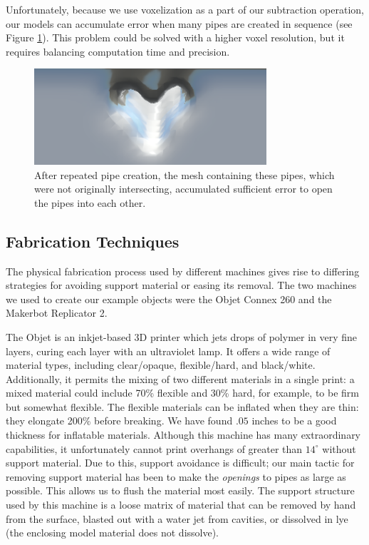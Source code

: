 Unfortunately, because we use voxelization as a part of our subtraction operation, our models can accumulate error when many pipes are created in sequence (see Figure \ref{fig:voxelize}).  This problem could be solved with a higher voxel resolution, but it requires balancing computation time and precision.

\begin{figure}[h!]
\centering
    \includegraphics[width=3.4in]{figures/voxelize-fail.png}
\caption{After repeated pipe creation, the mesh containing these pipes, which were not originally intersecting, accumulated sufficient error to open the pipes into each other. }
\label{fig:voxelize}
\end{figure}


\subsection{Fabrication Techniques}

  
The physical fabrication process used by different machines gives rise to differing strategies for avoiding support material or easing its removal.  The two machines we used to create our example objects were the Objet Connex 260 and the Makerbot Replicator 2.

The Objet is an inkjet-based 3D printer which jets drops of polymer in very fine layers, curing each layer with an ultraviolet lamp.  It offers a wide range of material types, including clear/opaque, flexible/hard, and black/white.  Additionally, it permits the mixing of two different materials in a single print: a mixed material could include 70\% flexible and 30\% hard, for example, to be firm but somewhat flexible.  The flexible materials can be inflated when they are thin: they elongate 200\% before breaking.  We have found $.05$ inches to be a good thickness for inflatable materials.  Although this machine has many extraordinary capabilities, it unfortunately cannot print overhangs of greater than $14^{\circ}$ without support material.  Due to this, support avoidance is difficult; our main tactic for removing support material has been to make the \emph{openings} to pipes as large as possible.  This allows us to flush the material most easily.  The support structure used by this machine is a loose matrix of material that can be removed by hand from the surface, blasted out with a water jet from cavities, or dissolved in lye (the enclosing model material does not dissolve).

